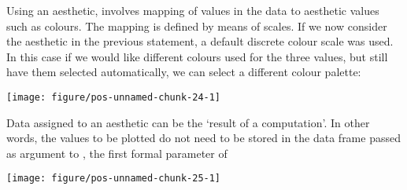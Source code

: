 \documentclass[paper=a4,headsepline,BCOR=12mm,twoside,open=right,%
titlepage,headings=small,fontsize=10pt,index=totoc,bibliography=totoc,%
captions=tableheading,captions=nooneline]{scrbook}\usepackage{knitr}
\begin{document}
Using an aesthetic, involves mapping of values in the data to aesthetic values such as colours. The mapping is defined by means of scales. If we now consider the  aesthetic in the previous statement, a default discrete colour scale was used. In this case if we would like different colours used for the three values, but still have them selected automatically, we can select a different colour palette:

\begin{knitrout}\footnotesize
{}\color{fgcolor}\begin{kframe}
\begin{alltt}
\hlstd{(} 
       \hlstd{(}     \hlstd{=}  \hlopt{+}
  \hlstd{(} \hlstd{=} \hlstd{(}\hlstd{))} \hlopt{+}
  \hlstd{(} \hlstd{=} \hlstd{,}  \hlstd{=} \hlstd{)} \hlopt{+}
  \hlstd{(}\hlstd{)}
\end{alltt}
\end{kframe}

{\centering \texttt{[image: figure/pos-unnamed-chunk-24-1]} 

}



\end{knitrout}

Data assigned to an aesthetic can be the `result of a computation'. In other words, the values to be plotted do not need to be stored in the data frame passed as argument to , the first formal parameter of 

\begin{knitrout}\footnotesize
{}\color{fgcolor}\begin{kframe}
\begin{alltt}
\hlstd{(} 
       \hlstd{(} \hlstd{=}    \hlopt{/}  \hlopt{+}
  \hlstd{()}
\end{alltt}
\end{kframe}

{\centering \texttt{[image: figure/pos-unnamed-chunk-25-1]} 

}



\end{knitrout}
\end{document}

